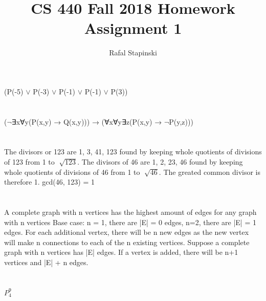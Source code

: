 \documentclass[a4paper]{article}
\title{CS 440 Fall 2018 Homework Assignment 1}
\author{Rafal Stapinski}
\begin{document}
\maketitle


\section{}
(P(-5) $\lor$ P(-3) $\lor$ P(-1) $\lor$ P(-1) $\lor$ P(3))

\section{}

($\neg$∃x∀y(P(x,y) → Q(x,y))) → (∀x∀y∃z(P(x,y) → $\neg$P(y,z)))

\section{}

The divisors or 123 are 1, 3, 41, 123 found by keeping whole quotients of divisions of 123 from 1 to $\sqrt[]{123}$.
The divisors of 46 are 1, 2, 23, 46 found by keeping whole quotients of divisions of 46 from 1 to $\sqrt[]{46}$.
The greated common divisor is therefore 1.
gcd(46, 123) = 1


\section{}

A complete graph with n vertices has the highest amount of edges for any graph with n vertices
Base case: n = 1, there are |E| = 0 edges, n=2, there are |E| = 1 edges.
For each additional vertex, there will be n new edges as the new vertex will make n connections to each of the n existing vertices. Suppose a complete graph with n vertices has |E| edges. If a vertex is added, there will be n+1 vertices and |E| + n edges. 


\section{}

$P_4^9$

\section{}
\end{document}
